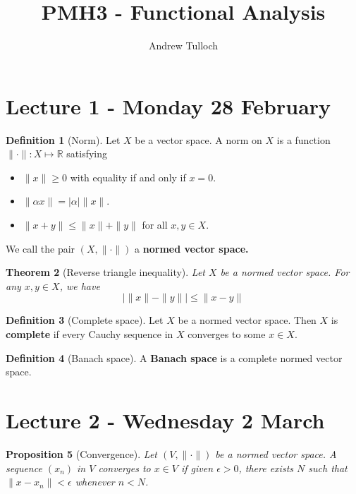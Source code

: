 \documentclass[10pt, oneside, reqno]{amsart}
\title{PMH3 - Functional Analysis}								%
\author{Andrew Tulloch}
\theoremstyle{plain}%
\newtheorem{thm}{Theorem}[section]
\newtheorem{prop}[thm]{Proposition}
\theoremstyle{definition}
\newtheorem{defn}[thm]{Definition}
\theoremstyle{remark}
\newcommand{\R}{\mathbb{R}}
\begin{document}
\maketitle

\section{Lecture 1 - Monday 28 February} %
\label{sec:lecture_1_28_february}

\begin{defn}[Norm]
	Let $X$ be a vector space.  A norm on $X$ is a function $\| \cdot \| : X \mapsto \R$ satisfying 
	\begin{itemize}
		\item $\| x \| \geq 0$ with equality if and only if $x = 0$.  
		\item $\| \alpha x \| = | \alpha | \| x \|$.
		\item $\| x + y \| \leq \| x \| + \| y \|$ for all $x, y \in X$.  
	\end{itemize}
	
	We call the pair $(X, \| \cdot \|)$ a \textbf{normed vector space.}
\end{defn}

\begin{thm}[Reverse triangle inequality]
	Let $X$ be a normed vector space.  For any $x, y \in X$, we have \[
		\left| \|x \| - \| y \| \right| \leq \| x - y \|  
	\]
\end{thm}

\begin{defn}[Complete space]
	Let $X$ be a normed vector space.  Then $X$ is \textbf{complete} if every Cauchy sequence in $X$ converges to some $x \in X$.  
\end{defn}

\begin{defn}[Banach space]
	A \textbf{Banach space} is a complete normed vector space.
\end{defn}



\section{Lecture 2 - Wednesday 2 March} %
\label{sec:lecture_2_2_march}

\begin{prop}[Convergence] Let $(V, \| \cdot \| )$ be a normed vector space.  A sequence $(x_n)$ in $V$ converges to $x \in V$ if given $\epsilon > 0$, there exists $N$ such that $\| x - x_n \| < \epsilon$ whenever $n < N$. 
\end{prop}
\end{document}
